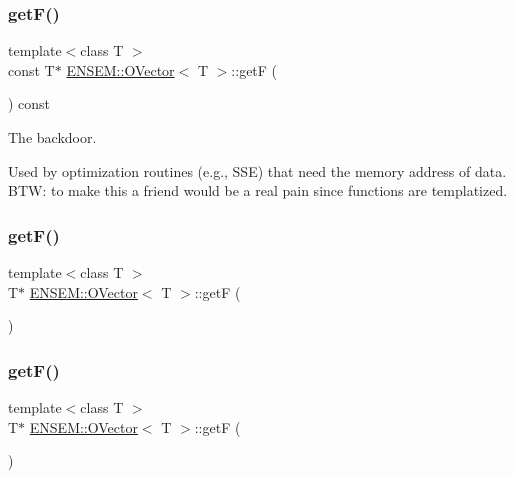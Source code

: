 \subsubsection{\texorpdfstring{getF()}{getF()}\hspace{0.1cm}{\footnotesize\ttfamily [3/6]}}
{\footnotesize\ttfamily template$<$class T $>$ \\
const T$\ast$ \mbox{\hyperlink{classENSEM_1_1OVector}{E\+N\+S\+E\+M\+::\+O\+Vector}}$<$ T $>$\+::getF (\begin{DoxyParamCaption}{ }\end{DoxyParamCaption}) const\hspace{0.3cm}{\ttfamily [inline]}}



The backdoor. 

Used by optimization routines (e.\+g., S\+SE) that need the memory address of data. B\+TW\+: to make this a friend would be a real pain since functions are templatized. \mbox{\label{classENSEM_1_1OVector_a73065fd6ed2149ce8699996d691c4c42}} 
\subsubsection{\texorpdfstring{getF()}{getF()}\hspace{0.1cm}{\footnotesize\ttfamily [4/6]}}
{\footnotesize\ttfamily template$<$class T $>$ \\
T$\ast$ \mbox{\hyperlink{classENSEM_1_1OVector}{E\+N\+S\+E\+M\+::\+O\+Vector}}$<$ T $>$\+::getF (\begin{DoxyParamCaption}{ }\end{DoxyParamCaption})\hspace{0.3cm}{\ttfamily [inline]}}

\mbox{\label{classENSEM_1_1OVector_a73065fd6ed2149ce8699996d691c4c42}} 
\subsubsection{\texorpdfstring{getF()}{getF()}\hspace{0.1cm}{\footnotesize\ttfamily [5/6]}}
{\footnotesize\ttfamily template$<$class T $>$ \\
T$\ast$ \mbox{\hyperlink{classENSEM_1_1OVector}{E\+N\+S\+E\+M\+::\+O\+Vector}}$<$ T $>$\+::getF (\begin{DoxyParamCaption}{ }\end{DoxyParamCaption})\hspace{0.3cm}{\ttfamily [inline]}}

